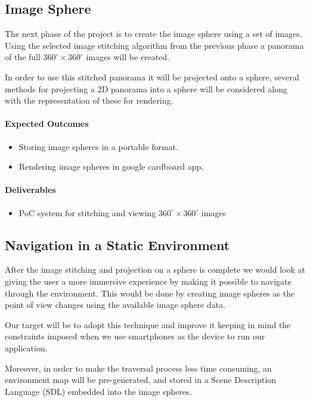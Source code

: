 \subsection{Image Sphere}
\label{intro_subsec:3_2}

The next phase of the project is to create the image sphere using a set of images. Using the selected image stitching algorithm from the previous phase a panorama of the full $360^{\circ}\times360^{\circ}$ images will be created. 

In order to use this stitched panorama it will be projected onto a sphere, several methods for projecting a 2D panorama into a sphere will be considered along with the representation of these for rendering.

\paragraph{\textbf{Expected Outcomes}}
\begin{itemize}
\item{Storing image spheres in a portable format.}
\item{Rendering image spheres in google cardboard app.}
\end{itemize}

\paragraph{\textbf{Deliverables}}
\begin{itemize}
\item{PoC system for stitching and viewing $360^{\circ}\times360^{\circ}$ images}
\end{itemize}

\subsection{Navigation in a Static Environment}
\label{intro_subsec:3_3}

After the image stitching and projection on a sphere is complete we would look at giving the user a more immersive experience by making it possible to navigate through the environment. This would be done by creating image spheres as the point of view changes using the available image sphere data.

Our target will be to adopt this technique and improve it keeping in mind the constraints imposed when we use smartphones as the device to run our application.

Moreover, in order to make the traversal process less time consuming, an environment map will be pre-generated, and stored in a Scene Description Language (SDL) embedded into the image spheres.

